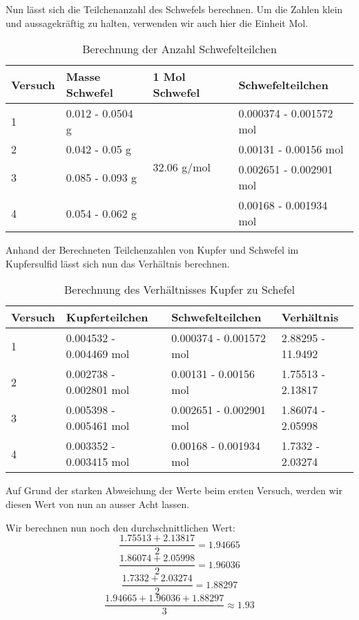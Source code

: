 \documentclass[11pt,paper=a4,final]{scrartcl}
\begin{document}
{Nun l\"asst sich die Teilchenanzahl des Schwefels berechnen. Um die Zahlen klein
und aussagekr\"aftig zu halten, verwenden wir auch hier die Einheit Mol.
\begin{table}[h!]
  \centering
  \begin{tabular}{|l|l|l|l|}\hline
    \bf Versuch & \bf Masse Schwefel & \bf 1 Mol Schwefel & \bf Schwefelteilchen
    \\ \hline
    1 & 0.012 - 0.0504 g & \multirow{4}{*}{32.06 g/mol} & 0.000374 - 0.001572
    mol \\ \cline{1-2} \cline{4-4}
    2 & 0.042 - 0.05 g & & 0.00131 - 0.00156 mol \\ \cline{1-2} \cline{4-4}
    3 & 0.085 - 0.093 g & & 0.002651 - 0.002901 mol \\ \cline{1-2} \cline{4-4}
    4 & 0.054 - 0.062 g & & 0.00168 - 0.001934 mol \\ \hline
  \end{tabular}
  \caption{Berechnung der Anzahl Schwefelteilchen}
  \label{tab:schwefelteilchen}
\end{table}

Anhand der Berechneten Teilchenzahlen von Kupfer und Schwefel im Kupfersulfid
l\"asst sich nun das Verh\"altnis berechnen.
\begin{table}[h!]
  \centering
  \begin{tabular}{|l|l|l|l|} \hline
    \bf Versuch & \bf Kupferteilchen & \bf Schwefelteilchen & \bf Verh\"altnis \\
    \hline
    1 & 0.004532 - 0.004469 mol & 0.000374 - 0.001572 mol & 2.88295 - 11.9492 \\
    \hline
    2 & 0.002738 - 0.002801 mol & 0.00131 - 0.00156 mol & 1.75513 - 2.13817 \\
    \hline
    3 & 0.005398 - 0.005461 mol & 0.002651 - 0.002901 mol & 1.86074 - 2.05998 \\
    \hline
    4 & 0.003352 - 0.003415 mol & 0.00168 - 0.001934 mol & 1.7332 - 2.03274 \\
    \hline
  \end{tabular}
  \caption{Berechnung des Verh\"altnisses Kupfer zu Schefel}
  \label{tab:verhaeltnis}
\end{table}

Auf Grund der starken Abweichung der Werte beim ersten Versuch, werden wir
diesen Wert von nun an ausser Acht lassen.

Wir berechnen nun noch den durchschnittlichen Wert:\\
\[  \frac{1.75513 + 2.13817}{2} = 1.94665 \]
\[  \frac{1.86074 + 2.05998}{2} = 1.96036 \]
\[  \frac{1.7332 + 2.03274}{2} = 1.88297 \]
\[  \frac{1.94665 + 1.96036 + 1.88297}{3} \approx 1.93 \]

}
\end{document}
